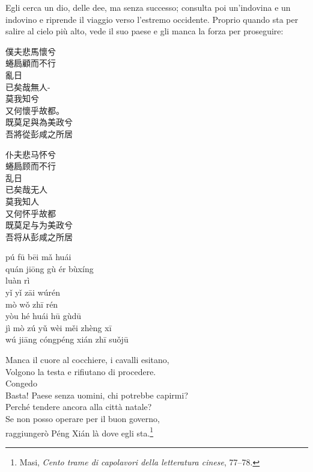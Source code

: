 \documentclass[12pt,titlepage]{article}
\begin{document}
  Egli cerca un dio, delle dee, ma senza successo; consulta poi un'indovina e un indovino e riprende il viaggio verso l'estremo occidente. Proprio quando sta per salire al cielo più alto, vede il suo paese e gli manca la forza per proseguire:
\begin{adjustwidth}{-2cm}{-2cm}%
\begin{multicols}{3}
\noindent
 \begin{CJK*}{UTF8}{gbsn}
 僕夫悲馬懷兮\\
 蜷扃顧而不行\\
 亂日\\
 已矣哉無人-\\
 莫我知兮\\
 又何懷乎故都。\\
 既莫足與為美政兮 \\
吾將從彭咸之所居\\\footnotemark
\end{CJK*}

\columnbreak
\noindent
 \begin{CJK*}{UTF8}{gbsn}
仆夫悲马怀兮\\
 蜷扃顾而不行\\
 乱日\\
已矣哉无人\\
莫我知人\\
 又何怀乎故都\\
既莫足与为美政兮 \\
吾将从彭咸之所居\\
\end{CJK*}

\columnbreak
\noindent
pú fū bēi mǎ huái \\
quán jiōng gù ér bùxíng\\
luàn rì	\\
yǐ yǐ zāi wúrén	\\
mò wǒ zhī rén	\\
yòu hé huái hū gùdū\\
jì mò zú yǔ wèi měi zhèng xī\\
wú jiāng cóngpéng xián zhī suǒjū\\
\end{multicols}
\end{adjustwidth}
%
%
%
\begin{center}
Manca il cuore al cocchiere, i cavalli esitano,\\
Volgono la testa e rifiutano di procedere.\\
Congedo\\
Basta! Paese senza uomini, chi potrebbe capirmi?\\
Perché tendere ancora alla città natale?\\
Se non posso operare per il buon governo,\\
raggiungerò Péng Xián là dove egli sta.\footnote{Masi, \emph{Cento trame di capolavori della letteratura cinese}, 77–78.}\\
\end{center}
\end{document}
